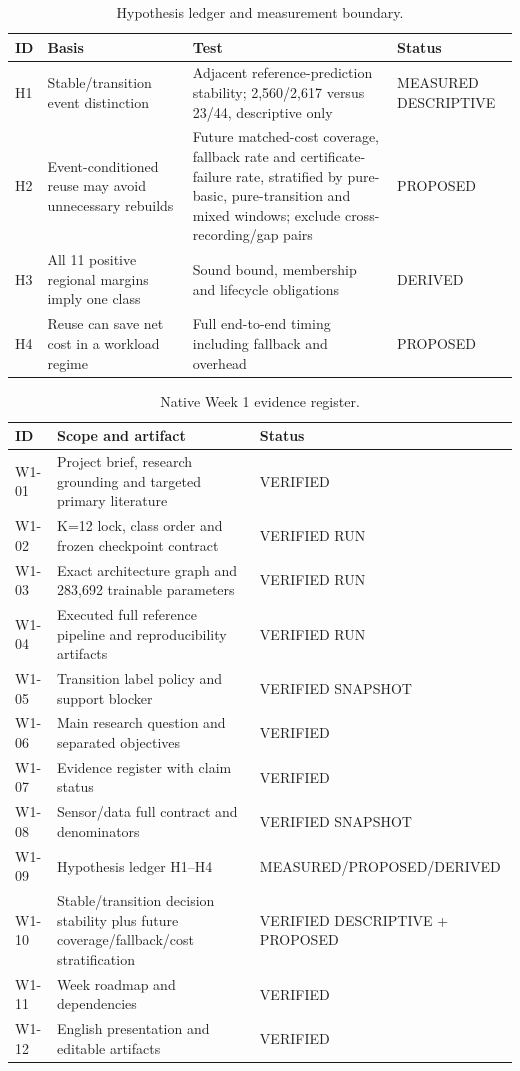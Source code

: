 \documentclass[11pt,a4paper]{article}
\begin{document}
\begin{table}[ht]\centering\small
\caption{Hypothesis ledger and measurement boundary.}
\begin{tabularx}{\linewidth}{@{}lYYY@{}}\toprule
ID & Basis & Test & Status\\\midrule
H1 & Stable/transition event distinction & Adjacent reference-prediction stability; 2,560/2,617 versus 23/44, descriptive only & MEASURED DESCRIPTIVE\\
H2 & Event-conditioned reuse may avoid unnecessary rebuilds & Future matched-cost coverage, fallback rate and certificate-failure rate, stratified by pure-basic, pure-transition and mixed windows; exclude cross-recording/gap pairs & PROPOSED\\
H3 & All 11 positive regional margins imply one class & Sound bound, membership and lifecycle obligations & DERIVED\\
H4 & Reuse can save net cost in a workload regime & Full end-to-end timing including fallback and overhead & PROPOSED\\\bottomrule
\end{tabularx}\end{table}

\begin{table}[ht]\centering\small
\caption{Native Week 1 evidence register.}
\begin{tabularx}{\linewidth}{@{}lYY@{}}\toprule
ID & Scope and artifact & Status\\\midrule
W1-01 & Project brief, research grounding and targeted primary literature & VERIFIED\\
W1-02 & K=12 lock, class order and frozen checkpoint contract & VERIFIED RUN\\
W1-03 & Exact architecture graph and 283,692 trainable parameters & VERIFIED RUN\\
W1-04 & Executed full reference pipeline and reproducibility artifacts & VERIFIED RUN\\
W1-05 & Transition label policy and support blocker & VERIFIED SNAPSHOT\\
W1-06 & Main research question and separated objectives & VERIFIED\\
W1-07 & Evidence register with claim status & VERIFIED\\
W1-08 & Sensor/data full contract and denominators & VERIFIED SNAPSHOT\\
W1-09 & Hypothesis ledger H1--H4 & MEASURED/PROPOSED/DERIVED\\
W1-10 & Stable/transition decision stability plus future coverage/fallback/cost stratification & VERIFIED DESCRIPTIVE + PROPOSED\\
W1-11 & Week roadmap and dependencies & VERIFIED\\
W1-12 & English presentation and editable artifacts & VERIFIED\\\bottomrule
\end{tabularx}\end{table}
\end{document}
